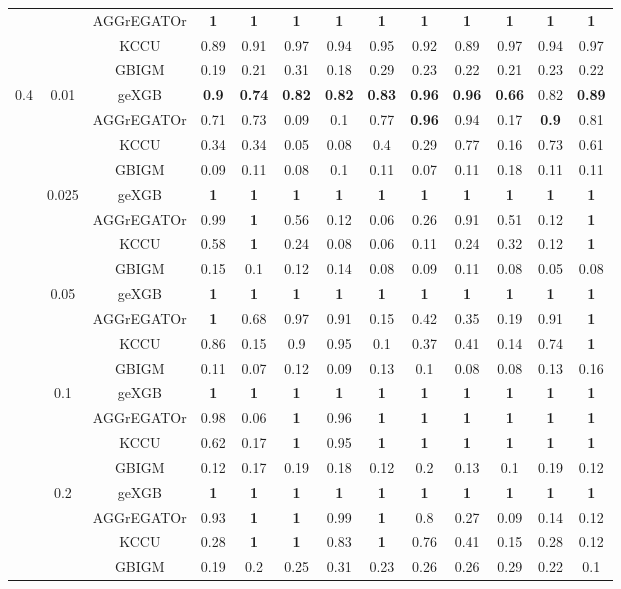 \documentclass[11pt]{article}
\theoremstyle{plain}
\theoremstyle{definition}
\theoremstyle{remark}
\begin{document}
\begin{table}[H]
\begin{tabular}{|c|c|c|cccccccccc|}
&&AGGrEGATOr&{\bf 1}&{\bf 1}&{\bf 1}&{\bf 1}&{\bf 1}&{\bf 1}&{\bf 1}&{\bf 1}&{\bf 1}&{\bf 1}\\
\cline{3-13}
&&KCCU&0.89&0.91&0.97&0.94&0.95&0.92&0.89&0.97&0.94&0.97\\
\cline{3-13}
      &&GBIGM&0.19&0.21&0.31&0.18&0.29&0.23&0.22&0.21&0.23&0.22\\
  \hline
  0.4&0.01&geXGB&{\bf 0.9}&{\bf 0.74}&{\bf 0.82}&{\bf 0.82}&{\bf 0.83}&{\bf 0.96}&{\bf 0.96}&{\bf 0.66}&0.82&{\bf 0.89}\\
\cline{3-13}
&&AGGrEGATOr&0.71&0.73&0.09&0.1&0.77&{\bf 0.96}&0.94&0.17&{\bf 0.9}&0.81\\
\cline{3-13}
&&KCCU&0.34&0.34&0.05&0.08&0.4&0.29&0.77&0.16&0.73&0.61\\
\cline{3-13}
&&GBIGM&0.09&0.11&0.08&0.1&0.11&0.07&0.11&0.18&0.11&0.11\\
\cline{2-13}
      &0.025&geXGB&{\bf 1}&{\bf 1}&{\bf 1}&{\bf 1}&{\bf 1}&{\bf 1}&{\bf 1}&{\bf 1}&{\bf 1}&{\bf 1}\\
  \cline{3-13}
      &&AGGrEGATOr&0.99&{\bf 1}&0.56&0.12&0.06&0.26&0.91&0.51&0.12&{\bf 1}\\
  \cline{3-13}
      &&KCCU&0.58&{\bf 1}&0.24&0.08&0.06&0.11&0.24&0.32&0.12&{\bf 1}\\
  \cline{3-13}
&&GBIGM&0.15&0.1&0.12&0.14&0.08&0.09&0.11&0.08&0.05&0.08\\
\cline{2-13}
      &0.05&geXGB&{\bf 1}&{\bf 1}&{\bf 1}&{\bf 1}&{\bf 1}&{\bf 1}&{\bf 1}&{\bf 1}&{\bf 1}&{\bf 1}\\
  \cline{3-13}
      &&AGGrEGATOr&{\bf 1}&0.68&0.97&0.91&0.15&0.42&0.35&0.19&0.91&{\bf 1}\\
  \cline{3-13}
      &&KCCU&0.86&0.15&0.9&0.95&0.1&0.37&0.41&0.14&0.74&{\bf 1}\\
  \cline{3-13}
      &&GBIGM&0.11&0.07&0.12&0.09&0.13&0.1&0.08&0.08&0.13&0.16\\
  \cline{2-13}
      &0.1&geXGB&{\bf 1}&{\bf 1}&{\bf 1}&{\bf 1}&{\bf 1}&{\bf 1}&{\bf 1}&{\bf 1}&{\bf 1}&{\bf 1}\\
  \cline{3-13}
      &&AGGrEGATOr&0.98&0.06&{\bf 1}&0.96&{\bf 1}&{\bf 1}&{\bf 1}&{\bf 1}&{\bf 1}&{\bf 1}\\
  \cline{3-13}
      &&KCCU&0.62&0.17&{\bf 1}&0.95&{\bf 1}&{\bf 1}&{\bf 1}&{\bf 1}&{\bf 1}&{\bf 1}\\
  \cline{3-13}
      &&GBIGM&0.12&0.17&0.19&0.18&0.12&0.2&0.13&0.1&0.19&0.12\\
  \cline{2-13}
      &0.2&geXGB&{\bf 1}&{\bf 1}&{\bf 1}&{\bf 1}&{\bf 1}&{\bf 1}&{\bf 1}&{\bf 1}&{\bf 1}&{\bf 1}\\
  \cline{3-13}
      &&AGGrEGATOr&0.93&{\bf 1}&{\bf 1}&0.99&{\bf 1}&0.8&0.27&0.09&0.14&0.12\\
  \cline{3-13}
      &&KCCU&0.28&{\bf 1}&{\bf 1}&0.83&{\bf 1}&0.76&0.41&0.15&0.28&0.12\\
  \cline{3-13}
&&GBIGM&0.19&0.2&0.25&0.31&0.23&0.26&0.26&0.29&0.22&0.1\\


\hline

\end{tabular}
\end{table}
\end{document}
